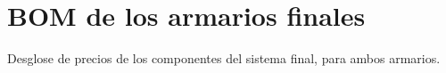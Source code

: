 
\chapter{BOM de los armarios finales} %

\label{app:BOM} %

Desglose de precios de los componentes del sistema final, para ambos armarios.

\newpage


